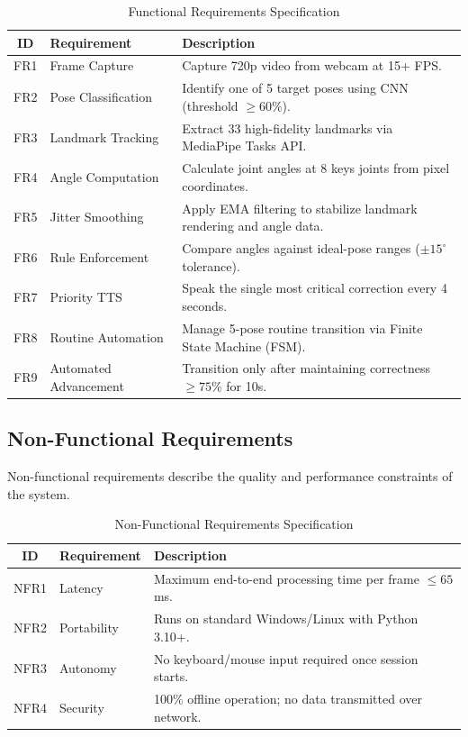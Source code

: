 \begin{table}[H]
    \centering
    \caption{Functional Requirements Specification}
    \begin{tabular}{|c|p{}|p{}|}
        \hline
        \textbf{ID} & \textbf{Requirement} & \textbf{Description} \\
        \hline
        FR1 & Frame Capture & Capture 720p video from webcam at 15+ FPS. \\
        \hline
        FR2 & Pose Classification & Identify one of 5 target poses using CNN (threshold $\geq 60\%$). \\
        \hline
        FR3 & Landmark Tracking & Extract 33 high-fidelity landmarks via MediaPipe Tasks API. \\
        \hline
        FR4 & Angle Computation & Calculate joint angles at 8 keys joints from pixel coordinates. \\
        \hline
        FR5 & Jitter Smoothing & Apply EMA filtering to stabilize landmark rendering and angle data. \\
        \hline
        FR6 & Rule Enforcement & Compare angles against ideal-pose ranges ($\pm 15^{\circ}$ tolerance). \\
        \hline
        FR7 & Priority TTS & Speak the single most critical correction every 4 seconds. \\
        \hline
        FR8 & Routine Automation & Manage 5-pose routine transition via Finite State Machine (FSM). \\
        \hline
        FR9 & Automated Advancement & Transition only after maintaining correctness $\geq 75\%$ for 10s. \\
        \hline
    \end{tabular}
    \label{tab:fr}
\end{table}

\subsection{Non-Functional Requirements}
Non-functional requirements describe the quality and performance constraints of the system.

\begin{table}[H]
    \centering
    \caption{Non-Functional Requirements Specification}
    \begin{tabular}{|c|p{}|p{}|}
        \hline
        \textbf{ID} & \textbf{Requirement} & \textbf{Description} \\
        \hline
        NFR1 & Latency & Maximum end-to-end processing time per frame $\leq 65$ms. \\
        \hline
        NFR2 & Portability & Runs on standard Windows/Linux with Python 3.10+. \\
        \hline
        NFR3 & Autonomy & No keyboard/mouse input required once session starts. \\
        \hline
        NFR4 & Security & 100\% offline operation; no data transmitted over network. \\
        \hline
    \end{tabular}
    \label{tab:nfr}
\end{table}

